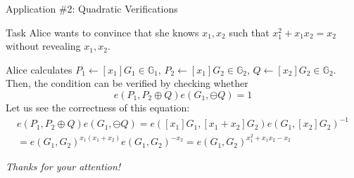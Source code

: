 \documentclass[xcolor={usenames,dvipsnames}]{beamer}
\begin{document}
    \begin{frame}{Application \#2: Quadratic Verifications}
        \begin{block}{Task}
            Alice wants to convince that she knows $x_1,x_2$ such that $x_1^2+x_1x_2=x_2$ without revealing $x_1,x_2$.
        \end{block}

        \begin{example}
            Alice calculates $P_1 \gets [x_1]G_1 \in \mathbb{G}_1$, $P_2 \gets [x_1]G_2 \in \mathbb{G}_2$, $Q \gets [x_2]G_2 \in \mathbb{G}_2$. Then, the condition can be verified by checking whether
            \begin{equation*}
                e(P_1,P_2\oplus Q)e(G_1,\ominus Q) = 1
            \end{equation*}
             Let us see the correctness of this equation:
            \begin{gather*}
                e(P_1,P_2\oplus Q)e(G_1,\ominus Q) = e([x_1]G_1,[x_1+x_2]G_2)e(G_1,[x_2]G_2)^{-1} \nonumber \\= e(G_1,G_2)^{x_1(x_1+x_2)}e(G_1,G_2)^{-x_2} = e(G_1,G_2)^{x_1^2+x_1x_2-x_2}
            \end{gather*}
        \end{example}
    \end{frame}
    
	\begin{frame}{}
      \centering \Large
      \emph{Thanks for your attention!}
    \end{frame}
\end{document}
